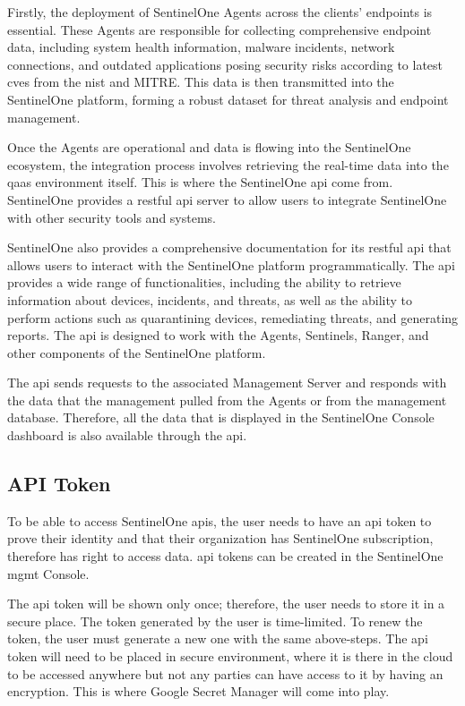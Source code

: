 Firstly, the deployment of SentinelOne Agents across the clients' endpoints is essential. These Agents are responsible
for collecting comprehensive endpoint data, including system health information, malware incidents, network connections,
and outdated applications posing security risks according to latest \acrshort{cve}s from the \acrshort{nist} and MITRE.
This data is then transmitted into the SentinelOne platform, forming a robust dataset for threat analysis and endpoint
management.

Once the Agents are operational and data is flowing into the SentinelOne ecosystem, the integration process involves
retrieving the real-time data into the \acrshort{qaas} environment itself. This is where the SentinelOne \acrshort{api}
come from. SentinelOne provides a \acrshort{rest}ful \acrshort{api} server to allow users to integrate SentinelOne with other
security tools and systems.

SentinelOne also provides a comprehensive documentation for its \acrshort{rest}ful \acrshort{api} that allows users to interact
with the SentinelOne platform programmatically. The \acrshort{api} provides a wide range of functionalities, including the ability
to retrieve information about devices, incidents, and threats, as well as the ability to perform actions such as quarantining devices,
remediating threats, and generating reports. The \acrshort{api} is designed to work with the Agents, Sentinels, Ranger, and other
components of the SentinelOne platform.

The \acrshort{api} sends requests to the associated Management Server and responds with the data that the management pulled from
the Agents or from the management database. Therefore, all the data that is displayed in the SentinelOne Console dashboard is also
available through the \acrshort{api}.

\subsection{API Token}

To be able to access SentinelOne \acrshort{api}s, the user needs to have an \acrshort{api} token to prove their
identity and that their organization has SentinelOne subscription, therefore has right to access data.
\acrshort{api} tokens can be created in the SentinelOne \acrshort{mgmt} Console.

The \acrshort{api} token will be shown only once; therefore, the user needs to store it in a secure place.
The token generated by the user is time-limited. To renew the token, the user must generate a new one with the same above-steps. The
\acrshort{api} token will need to be placed in secure environment, where it is there in the cloud to be accessed anywhere but not any
parties can have access to it by having an encryption. This is where Google Secret Manager will come into play.

